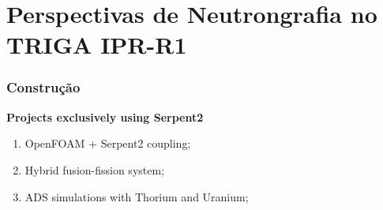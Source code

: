 \documentclass[svgnames,smaller,table]{beamer}
\begin{document}
\begin{frame}
  
\end{frame}
\begin{frame}
  
\end{frame}
\begin{frame}
  
\end{frame}
\begin{frame}
  
\end{frame}
\begin{frame}
  
\end{frame}




\section{Perspectivas de Neutrongrafia no TRIGA IPR-R1}
\begin{frame}
  \frametitle{Construção}
  \textbf{Projects exclusively using Serpent2}
  \vspace{10px}
  \begin{enumerate}
    \item OpenFOAM + Serpent2 coupling\cite{Antonella2002};
    \item Hybrid fusion-fission system\cite{Antonella2003};
    \item ADS simulations with Thorium and Uranium\cite{Wilson2017};
    \end{enumerate}
\end{frame}
\end{document}
